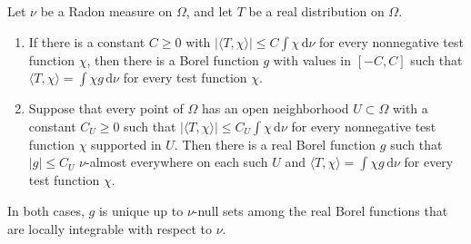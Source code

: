 \begin{corollary}\label{cor:distribution-bounded-density}
Let $\nu$ be a Radon measure on $\Omega$, and let $T$ be a real distribution on $\Omega$.
\begin{enumerate}
\item If there is a constant $C\geq0$ with $|\langle T,\chi\rangle|\leq C\int\chi\,\mathrm d\nu$ for every nonnegative test function $\chi$, then there is a Borel function $g$ with values in $[-C,C]$ such that $\langle T,\chi\rangle=\int\chi g\,\mathrm d\nu$ for every test function $\chi$.
\item Suppose that every point of $\Omega$ has an open neighborhood $U\subset\Omega$ with a constant $C_U\geq0$ such that $|\langle T,\chi\rangle|\leq C_U\int\chi\,\mathrm d\nu$ for every nonnegative test function $\chi$ supported in $U$. Then there is a real Borel function $g$ such that $|g|\leq C_U$ $\nu$-almost everywhere on each such $U$ and $\langle T,\chi\rangle=\int\chi g\,\mathrm d\nu$ for every test function $\chi$.
\end{enumerate}
In both cases, $g$ is unique up to $\nu$-null sets among the real Borel functions that are locally integrable with respect to $\nu$.
\end{corollary}
